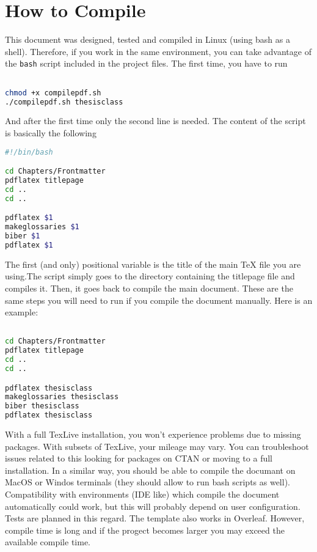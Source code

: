 \section{How to Compile}

This document was designed, tested and compiled in Linux (using bash as a shell). Therefore, if you work in the same environment, you can take advantage of the \texttt{bash} script included in the project files. The first time, you have to run

\begin{lstlisting}[language=bash,caption={bash version}]

chmod +x compilepdf.sh
./compilepdf.sh thesisclass

\end{lstlisting}

And after the first time only the second line is needed. The content of the script is basically the following

\begin{lstlisting}[language=bash,caption={bash version}]
#!/bin/bash  

cd Chapters/Frontmatter
pdflatex titlepage
cd ..
cd ..

pdflatex $1 
makeglossaries $1 
biber $1
pdflatex $1 

\end{lstlisting}

The first (and only) positional variable is the title of the main \TeX\hspace{2pt} file you are using.The script simply goes to the directory containing the titlepage file and compiles it. Then, it goes back to compile the main document. These are the same steps you will need to run if you compile the document manually. Here is an example:

\begin{lstlisting}[language=bash,caption={bash version}]

cd Chapters/Frontmatter
pdflatex titlepage
cd ..
cd ..

pdflatex thesisclass
makeglossaries thesisclass 
biber thesisclass
pdflatex thesisclass 

\end{lstlisting}
  

With a full TexLive installation, you won't experience problems due to missing packages. With subsets of TexLive, your mileage may vary. You can troubleshoot issues related to this looking for packages on CTAN or moving to a full installation. In a similar way, you should be able to compile the documant on MacOS or Windos terminals (they should allow to run bash scripts as well). Compatibility with environments (IDE like) which compile the document automatically could work, but this will probably depend on user configuration. Tests are planned in this regard. The template also works in Overleaf. However, compile time is long and if the progect becomes larger you may exceed the available compile time. 

